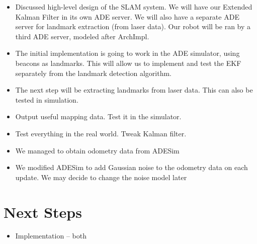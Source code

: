 \documentclass[12pt]{article}
\begin{document}
\begin{itemize}
    \setlength{\itemsep}{0pt}
    \setlength{\parskip}{0pt}
    \setlength{\parsep}{0pt}
    \item Discussed high-level design of the SLAM system. We will have our
          Extended Kalman Filter in its own ADE server. We will also have a
          separate ADE server for landmark extraction (from laser data). Our
          robot will be ran by a third ADE server, modeled after ArchImpl.
\end{itemize}

\begin{itemize}
    \setlength{\itemsep}{0pt}
    \setlength{\parskip}{0pt}
    \setlength{\parsep}{0pt}
    \item The initial implementation is going to work in the ADE simulator,
          using beacons as landmarks. This will allow us to implement and test
          the EKF separately from the landmark detection algorithm.
    \item The next step will be extracting landmarks from laser data. This can
          also be tested in simulation.
    \item Output useful mapping data. Test it in the simulator.
    \item Test everything in the real world. Tweak Kalman filter.
\end{itemize}

\begin{itemize}
    \setlength{\itemsep}{0pt}
    \setlength{\parskip}{0pt}
    \setlength{\parsep}{0pt}
    \item We managed to obtain odometry data from ADESim
    \item We modified ADESim to add Gaussian noise to the odometry data on each
          update. We may decide to change the noise model later
\end{itemize}


\section{Next Steps}

\begin{itemize}
    \setlength{\itemsep}{0pt}
    \setlength{\parskip}{0pt}
    \setlength{\parsep}{0pt}
    \item Implementation -- both
\end{itemize}
\end{document}
